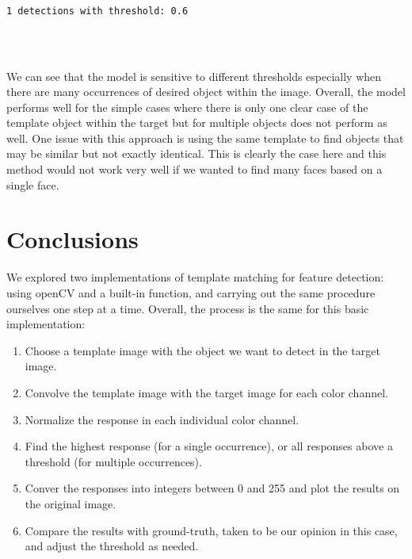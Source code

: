 \documentclass[11pt]{article}
\providecommand{\tightlist}{%
      \setlength{\itemsep}{0pt}\setlength{\parskip}{0pt}}
\begin{document}
    \begin{center}
    \end{center}
    { \hspace*{\fill} \\}
    
    \begin{Verbatim}[commandchars=\\\{\}]
1 detections with threshold: 0.6


    \end{Verbatim}

    \begin{center}
    \end{center}
    { \hspace*{\fill} \\}
    
    We can see that the model is sensitive to different thresholds
especially when there are many occurrences of desired object within the
image. Overall, the model performs well for the simple cases where there
is only one clear case of the template object within the target but for
multiple objects does not perform as well. One issue with this approach
is using the same template to find objects that may be similar but not
exactly identical. This is clearly the case here and this method would
not work very well if we wanted to find many faces based on a single
face.

    \hypertarget{conclusions}{%
\section{Conclusions}\label{conclusions}}

We explored two implementations of template matching for feature
detection: using openCV and a built-in function, and carrying out the
same procedure ourselves one step at a time. Overall, the process is the
same for this basic implementation:

\begin{enumerate}
\def\labelenumi{\arabic{enumi}.}
\tightlist
\item
  Choose a template image with the object we want to detect in the
  target image.
\item
  Convolve the template image with the target image for each color
  channel.
\item
  Normalize the response in each individual color channel.
\item
  Find the highest response (for a single occurrence), or all responses
  above a threshold (for multiple occurrences).
\item
  Conver the responses into integers between 0 and 255 and plot the
  results on the original image.
\item
  Compare the results with ground-truth, taken to be our opinion in this
  case, and adjust the threshold as needed.
\end{enumerate}
\end{document}
